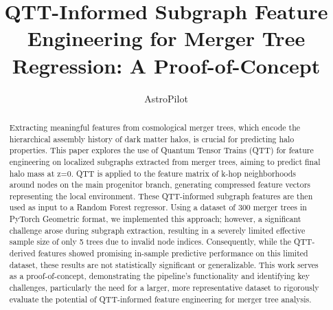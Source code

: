 \documentclass[twocolumn]{aastex631}
\begin{document}
\title{QTT-Informed Subgraph Feature Engineering for Merger Tree Regression: A Proof-of-Concept}

\author{AstroPilot}

\begin{abstract}
Extracting meaningful features from cosmological merger trees, which encode the hierarchical assembly history of dark matter halos, is crucial for predicting halo properties. This paper explores the use of Quantum Tensor Trains (QTT) for feature engineering on localized subgraphs extracted from merger trees, aiming to predict final halo mass at z=0. QTT is applied to the feature matrix of k-hop neighborhoods around nodes on the main progenitor branch, generating compressed feature vectors representing the local environment. These QTT-informed subgraph features are then used as input to a Random Forest regressor. Using a dataset of 300 merger trees in PyTorch Geometric format, we implemented this approach; however, a significant challenge arose during subgraph extraction, resulting in a severely limited effective sample size of only 5 trees due to invalid node indices. Consequently, while the QTT-derived features showed promising in-sample predictive performance on this limited dataset, these results are not statistically significant or generalizable. This work serves as a proof-of-concept, demonstrating the pipeline's functionality and identifying key challenges, particularly the need for a larger, more representative dataset to rigorously evaluate the potential of QTT-informed feature engineering for merger tree analysis.
\end{abstract}

\end{document}
